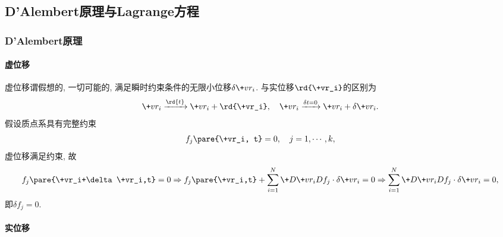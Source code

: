 \documentclass[../LectureNotes.tex]{subfiles}
\begin{document}


\subsection{D'Alembert原理与Lagrange方程} %
\label{sub:d_alembert原理与lagrange方程}

\subsubsection{D'Alembert原理} %
\label{ssub:d_alembert原理}

\paragraph{虚位移} %
\label{par:虚位移}

虚位移谓假想的, 一切可能的, 满足瞬时约束条件的无限小位移$\delta\+vr_i$. 与实位移$\rd{\+vr_i}$的区别为
\[ \+vr_i \xrightarrow{\rd{t}} \+vr_i+\rd{\+vr_i},\quad \+vr_i \xrightarrow{\delta t = 0} \+vr_i + \delta\+vr_i. \]
假设质点系具有完整约束
\[ f_j\pare{\+vr_i, t} = 0,\quad j = 1,\cdots, k, \]
虚位移满足约束, 故
\[ f_j\pare{\+vr_i+\delta \+vr_i,t} = 0 \Rightarrow f_j\pare{\+vr_i,t} + \sum_{i=1}^N \+D{\+vr_i}D{f_j}\cdot\delta\+vr_i = 0 \Rightarrow \sum_{i=1}^N \+D{\+vr_i}D{f_j}\cdot\delta\+vr_i = 0, \]
即$\delta f_j = 0$.


\paragraph{实位移} %
\label{par:实位移}
\end{document}
